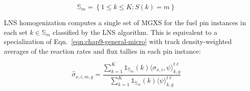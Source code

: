 \documentclass[12pt,twoside]{mitthesis-exec}
\begin{document}
\begin{equation}
\label{eqn:imgxs-set}
\mathbb{S}_{m} = \left\{1 \le k \le K: S(k) = m\right\}
\end{equation}

LNS homogenization computes a single set of MGXS for the fuel pin instances in each set $k \in \mathbb{S}_{m}$ classified by the LNS algorithm. This is equivalent to a specialization of Eqn.~\ref{eqn:chap9-general-micro} with track density-weighted averages of the reaction rates and flux tallies in each pin instance:

\begin{equation}
\label{eqn:imgxs-micro}
\hat{\sigma}_{x,i,m,g} = \frac{\displaystyle\sum\limits_{k=1}^{K}\mathbb{1}_{\mathbb{S}_{m}}(k) \langle \sigma_{x,i}, \psi \rangle_{k,g}^{t\ell}}{\displaystyle\sum\limits_{k=1}^{K}\mathbb{1}_{\mathbb{S}_{m}}(k) \langle \psi \rangle_{k,g}^{t\ell}}
\end{equation}
\end{document}
